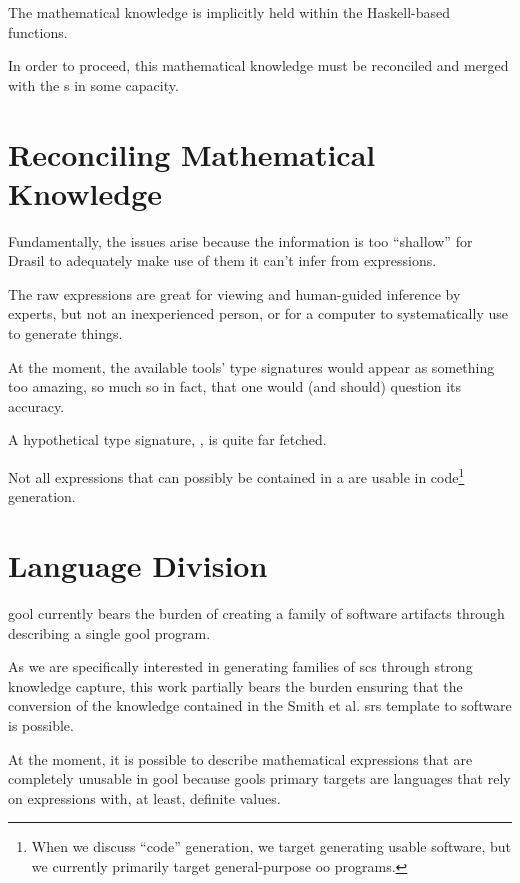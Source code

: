 The mathematical knowledge is implicitly held within the Haskell-based
functions.

In order to proceed, this mathematical knowledge must be reconciled and merged
with the \RelationConcept{}s in some capacity.

\theoriesWithoutModelKinds{}

\section{Reconciling Mathematical Knowledge}




Fundamentally, the issues arise because the information is too ``shallow'' for
Drasil to adequately make use of them \textemdash{} it can't infer from
expressions.

The raw expressions are great for viewing and human-guided inference by experts,
but not an inexperienced person, or for a computer to systematically use to
generate things.

At the moment, the available tools' type signatures would appear as something
too amazing, so much so in fact, that one would (and should) question its
accuracy.

A hypothetical type signature, , is quite far
fetched.

Not all expressions that can possibly be contained in a \RelationConcept{} are
usable in code\footnote{When we discuss ``code'' generation, we target
generating usable software, but we currently primarily target general-purpose
\acs{oo} programs.} generation.

\section{Language Division}

\acs{gool} currently bears the burden of creating a family of software artifacts
through describing a single \acs{gool} program.

As we are specifically interested in generating families of \acs{scs} through
strong knowledge capture, this work partially bears the burden ensuring that the
conversion of the knowledge contained in the Smith et al. \acs{srs} template
\cite{SmithAndLai2005} to software is possible.

At the moment, it is possible to describe mathematical expressions that are
completely unusable in \acs{gool} because \acsp{gool} primary targets are
languages that rely on expressions with, at least, definite values.

